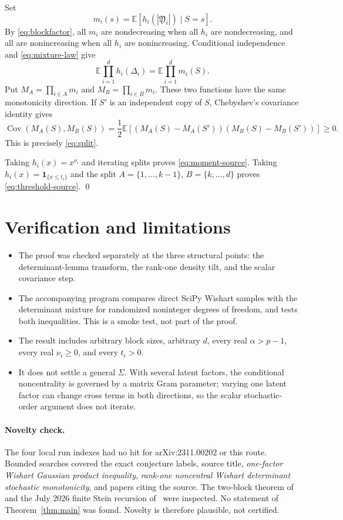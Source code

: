 \documentclass[11pt]{article}
\newcommand{\E}{\mathbb E}
\begin{document}
Set
\[
 m_i(s)=\E[h_i(|\mathfrak Y_i|)\mid S=s].
\]
By \eqref{eq:blockfactor}, all \(m_i\) are nondecreasing when all \(h_i\)
are nondecreasing, and all are nonincreasing when all \(h_i\) are
nonincreasing.  Conditional independence and \eqref{eq:mixture-law} give
\[
 \E\prod_{i=1}^d h_i(\Delta_i)
 =\E\prod_{i=1}^d m_i(S).
\]
Put \(M_A=\prod_{i\in A}m_i\) and \(M_B=\prod_{i\in B}m_i\).  These two
functions have the same monotonicity direction.  If \(S'\) is an independent
copy of \(S\), Chebyshev's covariance identity gives
\[
 \operatorname{Cov}(M_A(S),M_B(S))
 =\frac12\E\!\left[
 (M_A(S)-M_A(S'))(M_B(S)-M_B(S'))\right]\geq0.
\]
This is precisely \eqref{eq:split}.

Taking \(h_i(x)=x^{\nu_i}\) and iterating splits proves
\eqref{eq:moment-source}.  Taking
\(h_i(x)=\mathbf1_{\{x\leq t_i\}}\) and the split
\(A=\{1,\ldots,k-1\}\), \(B=\{k,\ldots,d\}\) proves
\eqref{eq:threshold-source}. \qed

\section{Verification and limitations}

\begin{itemize}[leftmargin=*]
\item The proof was checked separately at the three structural points:
the determinant-lemma transform, the rank-one density tilt, and the scalar
covariance step.
\item The accompanying program compares direct SciPy Wishart samples with
the determinant mixture for randomized noninteger degrees of freedom, and
tests both inequalities.  This is a smoke test, not part of the proof.
\item The result includes arbitrary block sizes, arbitrary \(d\), every
real \(\alpha>p-1\), every real \(\nu_i\geq0\), and every \(t_i>0\).
\item It does not settle a general \(\Sigma\).  With several latent factors,
the conditional noncentrality is governed by a matrix Gram parameter; varying
one latent factor can change cross terms in both directions, so the scalar
stochastic-order argument does not iterate.
\end{itemize}

\paragraph{Novelty check.}
The four local run indexes had no hit for arXiv:2311.00202 or this route.
Bounded searches covered the exact conjecture labels, source title,
\emph{one-factor Wishart Gaussian product inequality},
\emph{rank-one noncentral Wishart determinant stochastic monotonicity}, and
papers citing the source.  The two-block theorem of~\cite{GORtwo} and the
July 2026 finite Stein recursion of~\cite{GO} were inspected.  No statement
of Theorem~\ref{thm:main} was found.  Novelty is therefore plausible, not
certified.
\end{document}
